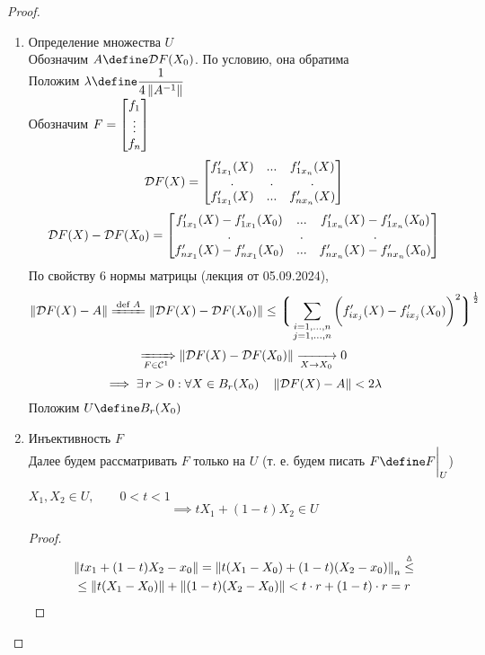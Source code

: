 \begin{proof}
	\hfill
	\begin{enumerate}
		\item Определение множества $ U $ \\
		Обозначим $ A \define \mc{D}F(X_0) $. По условию, она обратима \\
		Положим $ \lambda \define \dfrac1{4\norm{A^{-1}}} $ \\
		Обозначим $ F =  \begin{bmatrix} {f_1} \\ \vdots \\ {f_n} \end{bmatrix}  $
		$$ \mathcal{D}F(X) =
		\begin{bmatrix}
			f_{1x_1}'(X) & ... & f_{1x_n}'(X) \\
			. & . & . \\
			f_{1x_1}'(X) & ... & f_{nx_n}'(X)
		\end{bmatrix} $$
		$$ \mathcal{D}F(X) - \mathcal{D}F(X_0) =
		\begin{bmatrix}
			f_{1x_1}'(X) - f_{1x_1}'(X_0) & ... & f_{1x_n}'(X) - f_{1x_n}'(X_0) \\
			. & . & . \\
			f_{nx_1}'(X) - f_{nx_1}'(X_0) & ... & f_{nx_n}'(X) - f_{nx_n}'(X_0)
		\end{bmatrix} $$
		По свойству 6 нормы матрицы (лекция от 05.09.2024),
		$$ \norm{\mc{D}F(X) - A} \bdefeq{A} \norm{\mc{D}F(X) - \mc{D}F(X_0)} \le \bigg\lgroup \sum_{
			\begin{subarray}{c}
				i = 1, ..., n \\
				j = 1, ..., n
			\end{subarray}} \bigg( f_{ix_j}'(X) - f_{ix_j}'(X_0) \bigg)^2 \bigg\rgroup^{\frac12} $$
		$$ \xRightarrow[F \in \mathcal{C}^1]{} \left\|{\mathcal{D}F(X) - \mathcal{D}F(X_0)}\right\| \xrightarrow[X \to X_0]{} 0 $$
		$$ \implies \exists\, r > 0 : \forall X \in B_r(X_0) \quad \left\|{\mathcal{D}F(X) - A}\right\| < 2\lambda $$
		Положим $ U \define B_r(X_0) $
		\item Инъективность $ F $ \\
		Далее будем рассматривать $ F $ только на $ U $ (т. е. будем писать $ F \define F\clamp{U} $)
		\begin{remark}
			$ X_1, X_2 \in U, \qquad 0 < t < 1 $
			$$ \implies tX_1 + (1 - t)X_2 \in U $$
		\end{remark}
		\begin{proof}
			\begin{multline*}
				\left\|{tx_1 + (1 - t)X_2 - x_0}\right\| = \left\|{t(X_1 - X_0) + (1 - t)(X_2 - x_0)}\right\|_n \stackrel\vartriangle\le \\
				\le \left\|{t(X_1 - X_0)}\right\| + \left\|{(1 - t)(X_2 - X_0)}\right\| < t \cdot r + (1 - t) \cdot r = r
			\end{multline*}

\end{proof}
\end{enumerate}
\end{proof}
